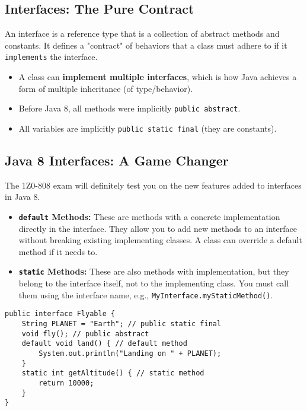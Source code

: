 \documentclass[12pt]{article}
\begin{document}
\begin{enumerate}[label=(\arabic*)]
\subsection{Interfaces: The Pure Contract}
An interface is a reference type that is a collection of abstract methods and constants. It defines a "contract" of behaviors that a class must adhere to if it \texttt{implements} the interface.
\begin{itemize}
    \item A class can \textbf{implement multiple interfaces}, which is how Java achieves a form of multiple inheritance (of type/behavior).
    \item Before Java 8, all methods were implicitly \texttt{public abstract}.
    \item All variables are implicitly \texttt{public static final} (they are constants).
\end{itemize}

\subsection{Java 8 Interfaces: A Game Changer}
The 1Z0-808 exam will definitely test you on the new features added to interfaces in Java 8.
\begin{itemize}
    \item \textbf{\texttt{default} Methods:} These are methods with a concrete implementation directly in the interface. They allow you to add new methods to an interface without breaking existing implementing classes. A class can override a default method if it needs to.
    \item \textbf{\texttt{static} Methods:} These are also methods with implementation, but they belong to the interface itself, not to the implementing class. You must call them using the interface name, e.g., \texttt{MyInterface.myStaticMethod()}.
\end{itemize}
\begin{verbatim}
public interface Flyable {
    String PLANET = "Earth"; // public static final
    void fly(); // public abstract
    default void land() { // default method
        System.out.println("Landing on " + PLANET);
    }
    static int getAltitude() { // static method
        return 10000;
    }
}
\end{verbatim}


\end{enumerate}
\end{document}
